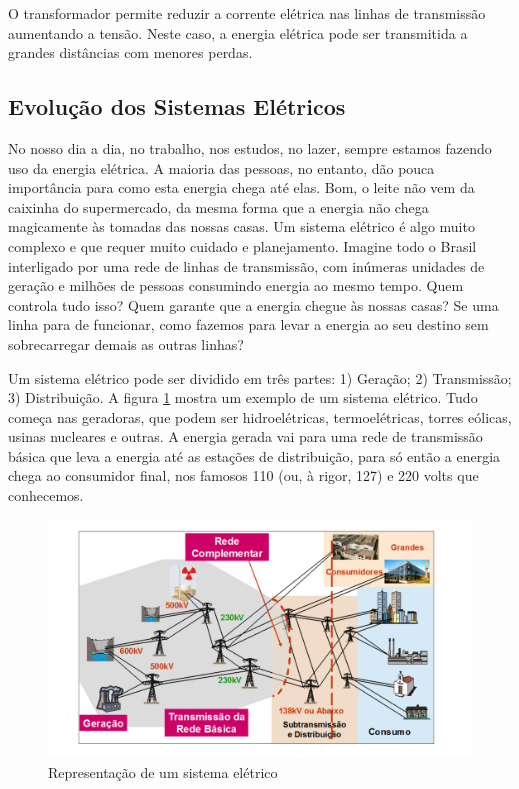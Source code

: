 O transformador permite reduzir a corrente elétrica nas linhas
de transmissão aumentando a tensão. Neste caso, a energia elétrica
pode ser transmitida a grandes distâncias com menores perdas. 




\subsection{Evolução dos Sistemas Elétricos}


No nosso dia a dia, no trabalho, nos estudos, no lazer, sempre estamos fazendo uso da energia elétrica. A maioria das pessoas, no entanto, dão pouca importância para como esta energia chega até elas. Bom, o leite não vem da caixinha do supermercado, da mesma forma que a energia não chega magicamente às tomadas das nossas casas. Um sistema elétrico é algo muito complexo e que requer muito cuidado e planejamento. Imagine todo o Brasil interligado por uma rede de linhas de transmissão, com inúmeras unidades de geração e milhões de pessoas consumindo energia ao mesmo tempo. Quem controla tudo isso? Quem garante que a energia chegue às nossas casas? Se uma linha para de funcionar, como fazemos para levar a energia ao seu destino sem sobrecarregar demais as outras linhas?


Um sistema elétrico pode ser dividido em três partes: 1) Geração; 2) Transmissão; 3) Distribuição. A figura \ref{fig:sist} mostra um exemplo de um sistema elétrico. Tudo começa nas geradoras, que podem ser hidroelétricas, termoelétricas, torres eólicas, usinas nucleares e outras. A energia gerada vai para uma rede de transmissão básica que leva a energia até as estações de distribuição, para só então a energia chega ao consumidor final, nos famosos 110 (ou, à rigor, 127) e 220 volts que conhecemos. 

\begin{figure}[h]
\begin{centering}
\includegraphics[scale=0.5]{anexos/figsist}
\par\end{centering}

\caption{\label{fig:sist}Representação de um sistema elétrico}
\end{figure}

